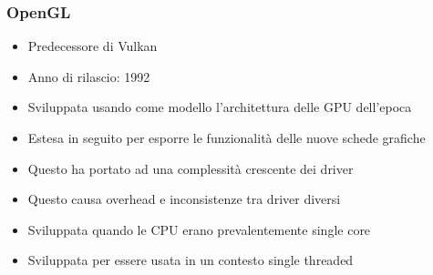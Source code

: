 \begin{frame}
\frametitle{OpenGL}

\begin{itemize}
\item Predecessore di Vulkan
\item Anno di rilascio: 1992
\item Sviluppata usando come modello l'architettura delle GPU dell'epoca
\item Estesa in seguito per esporre le funzionalità delle nuove schede grafiche
\item Questo ha portato ad una complessità crescente dei driver
\item Questo causa overhead e inconsistenze tra driver diversi
\item Sviluppata quando le CPU erano prevalentemente single core
\item Sviluppata per essere usata in un contesto single threaded
\end{itemize}

\end{frame}
